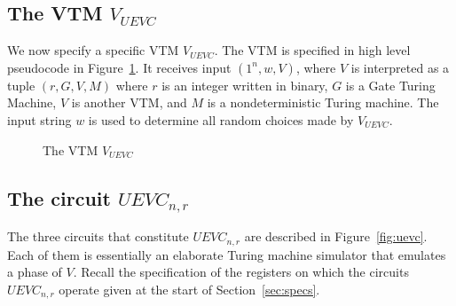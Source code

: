 \subsection{The VTM $V_{UEVC}$}
\label{sec:vtm-lambda}

We now specify a specific VTM $V_{UEVC}$. The VTM is specified in high level pseudocode in Figure~\ref{fig:lambda}. It receives input $(1^n,w,V)$, where $V$ is interpreted as a tuple $(r,G,V,M)$ where $r$ is an integer written in binary, $G$ is a Gate Turing Machine, $V$ is another VTM, and $M$ is a nondeterministic Turing machine. The input string $w$ is used to determine all random choices made by $V_{UEVC}$.

\begin{figure}[H]
\begin{center}

\end{center}
\caption{The VTM $V_{UEVC}$}
\label{fig:lambda}
\end{figure}

\subsection{The circuit $UEVC_{n,r}$}

The three circuits that constitute $UEVC_{n,r}$ are described in Figure~\ref{fig:uevc}. Each of them is essentially an elaborate Turing machine simulator that emulates a phase of $V$. Recall the specification of the registers on which the circuits $UEVC_{n,r}$ operate given at the start of Section~\ref{sec:specs}. 



